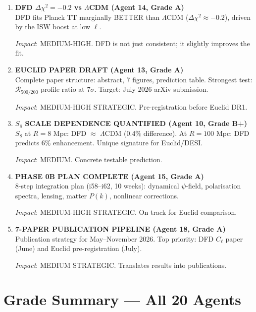 \documentclass[11pt,a4paper]{article}
\begin{document}
\begin{enumerate}[label=\textbf{\arabic*.}, leftmargin=1.5cm]
\textit{Impact}: HIGH CONCEPTUAL. Reframes the last RED from ``error'' to ``mathematical challenge.''

\item \textbf{DFD $\Delta\chi^2 = -0.2$ vs $\Lambda$CDM (Agent 14, Grade A)}\\
DFD fits Planck TT marginally BETTER than $\Lambda$CDM ($\Delta\chi^2 \approx -0.2$), driven by the ISW boost at low $\ell$.

\textit{Impact}: MEDIUM-HIGH. DFD is not just consistent; it slightly improves the fit.

\item \textbf{EUCLID PAPER DRAFT (Agent 13, Grade A)}\\
Complete paper structure: abstract, 7 figures, prediction table. Strongest test: $\mathcal{R}_{500/200}$ profile ratio at $7\sigma$. Target: July 2026 arXiv submission.

\textit{Impact}: MEDIUM-HIGH STRATEGIC. Pre-registration before Euclid DR1.

\item \textbf{$S_8$ SCALE DEPENDENCE QUANTIFIED (Agent 10, Grade B+)}\\
$S_8$ at $R = 8$ Mpc: DFD $\approx$ $\Lambda$CDM (0.4\% difference). At $R = 100$ Mpc: DFD predicts 6\% enhancement. Unique signature for Euclid/DESI.

\textit{Impact}: MEDIUM. Concrete testable prediction.

\item \textbf{PHASE 0B PLAN COMPLETE (Agent 15, Grade A)}\\
8-step integration plan (i58--i62, 10 weeks): dynamical $\psi$-field, polarisation spectra, lensing, matter $P(k)$, nonlinear corrections.

\textit{Impact}: MEDIUM-HIGH STRATEGIC. On track for Euclid comparison.

\item \textbf{7-PAPER PUBLICATION PIPELINE (Agent 18, Grade A)}\\
Publication strategy for May--November 2026. Top priority: DFD $C_\ell$ paper (June) and Euclid pre-registration (July).

\textit{Impact}: MEDIUM STRATEGIC. Translates results into publications.
\end{enumerate}


\section{Grade Summary --- All 20 Agents}
\label{sec:grades}
\end{document}
